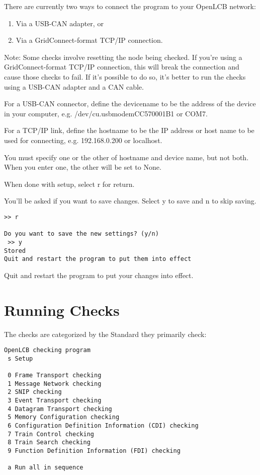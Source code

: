 There are currently two ways to connect the program to your OpenLCB network:
\begin{enumerate}
\item Via a USB-CAN adapter, or
\item Via a GridConnect-format TCP/IP connection.
\end{enumerate}

Note:  Some checks involve resetting the node being checked.
If you're using a GridConnect-format TCP/IP connection, this will break the
connection and cause those checks to fail.  If it's possible to do so, it's
better to run the checks using a USB-CAN adapter and a CAN cable.

For a USB-CAN connector, define the devicename to be the address of the device in your computer,
e.g. /dev/cu.usbmodemCC570001B1 or COM7.

For a TCP/IP link, define the hostname to be the IP address or host name to be used
for connecting, e.g. 192.168.0.200 or localhost.

You must specify one or the other of hostname and device name, but not both.
When you enter one, the other will be set to None.

When done with setup, select r for return.

You'll be asked if you want to save changes.
Select y to save and n to skip saving.

\begin{verbatim}
>> r

Do you want to save the new settings? (y/n)
 >> y
Stored
Quit and restart the program to put them into effect
\end{verbatim}

Quit and restart the program to put your changes into effect.

\section{Running Checks}

The checks are categorized by the Standard they primarily check:

\begin{verbatim}
OpenLCB checking program
 s Setup

 0 Frame Transport checking
 1 Message Network checking
 2 SNIP checking
 3 Event Transport checking
 4 Datagram Transport checking
 5 Memory Configuration checking
 6 Configuration Definition Information (CDI) checking
 7 Train Control checking
 8 Train Search checking
 9 Function Definition Information (FDI) checking
  
 a Run all in sequence
 
\end{verbatim}

